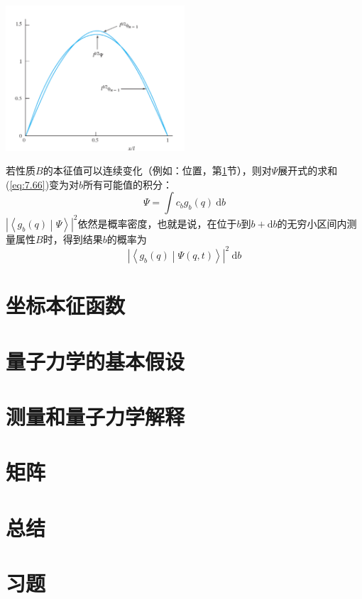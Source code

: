 \begin{examplebox}
        \vspace{1em}
        \begin{center}
            \includegraphics[width=0.5\textwidth]{Figures/7.3.png}
            \label{fig:7.3}
        \end{center}
        \vspace{1em}
    \end{examplebox}

    若性质$B$的本征值可以连续变化（例如：位置，第\ref{sec:7.7 Position Eigenfunctions}节），则对$\Psi$展开式的求和(\ref{eq:7.66})变为对$b$所有可能值的积分：
    \begin{equation}
        \Psi = \int c_bg_b\left(q\right)\:\mathrm{d}b
        \label{eq:7.75}
    \end{equation}
    $\left| \left\langle g_b\left(q\right) \middle| \Psi \right\rangle \right|^2$依然是概率密度，也就是说，在位于$b$到$b+\mathrm{d}b$的无穷小区间内测量属性$B$时，得到结果$b$的概率为
    \begin{equation}
        \left| \left\langle g_b\left(q\right) \middle| \Psi\left(q,t\right) \right\rangle \right|^2\:\mathrm{d}b
        \label{eq:7.76}
    \end{equation}

\section{坐标本征函数}
\label{sec:7.7 Position Eigenfunctions}











\section{量子力学的基本假设}
\label{sec:7.8 The Postulates of Quantum Mechanics}

\section{测量和量子力学解释}
\label{sec:7.9 Measurement and the Interpretation of Quantum Mechanics}

\section{矩阵}
\label{sec:7.10 Matrices}

\section*{总结}

\section*{习题}